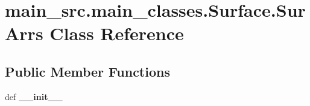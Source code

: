 \hypertarget{classmain__src_1_1main__classes_1_1Surface_1_1SurArrs}{\section{main\-\_\-src.\-main\-\_\-classes.\-Surface.\-Sur\-Arrs Class Reference}
\label{classmain__src_1_1main__classes_1_1Surface_1_1SurArrs}
}
\subsection*{Public Member Functions}
\begin{DoxyCompactItemize}
\item 
\hypertarget{classmain__src_1_1main__classes_1_1Surface_1_1SurArrs_a5178372cc2aee55ffc97904e0e460771}{def {\bfseries \-\_\-\-\_\-init\-\_\-\-\_\-}}\label{classmain__src_1_1main__classes_1_1Surface_1_1SurArrs_a5178372cc2aee55ffc97904e0e460771}

\end{DoxyCompactItemize}
